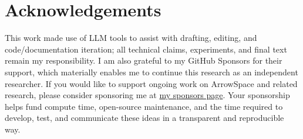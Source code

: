 \documentclass[12pt,a4paper]{article}
\theoremstyle{plain}
\theoremstyle{definition}
\theoremstyle{remark}
\newcommand{\1}{\mathbf{1}}
\begin{document}
	\section{Acknowledgements}
	This work made use of LLM tools to assist with drafting, editing, and code/documentation iteration; all technical claims, experiments, and final text remain my responsibility. I am also grateful to my GitHub Sponsors for their support, which materially enables me to continue this research as an independent researcher. If you would like to support ongoing work on ArrowSpace and related research, please consider sponsoring me at \href{https://github.com/sponsors/tuned-org-uk}{my sponsors page}. Your sponsorship helps fund compute time, open-source maintenance, and the time required to
	develop, test, and communicate these ideas in a transparent and reproducible way.
	
\end{document}
